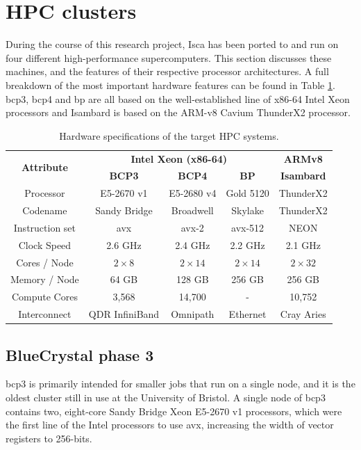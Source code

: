 \documentclass[a4paper,11pt]{report}
\begin{document}
\section{HPC clusters}
During the course of this research project, Isca has been ported to and run on four different high-performance supercomputers. This section discusses these machines, and the features of their respective processor architectures. A full breakdown of the most important hardware features can be found in Table \ref{tbl:hardware}. \gls{bcp3}, \gls{bcp4} and \gls{bp} are all based on the well-established line of x86-64 Intel Xeon processors and Isambard is based on the ARM-v8 Cavium ThunderX2 processor.
\begin{table}[!ht]
\centering
\caption[Hardware specifications of the target HPC systems]{Hardware specifications of the target HPC systems. }
\begin{tabular}{@{\extracolsep{4pt}}ccccc}
\toprule 
\multirow{2}{*}{\textbf{Attribute}} & \multicolumn{3}{c}{\textbf{Intel Xeon (x86-64)}} & \multicolumn{1}{c}{\textbf{ARMv8}}\\

				\cmidrule(lr){2-4} \cmidrule(lr){5-5}

 				& {\textbf{BCP3}} 	& {\textbf{BCP4}} 		& {\textbf{BP}} 		& {\textbf{Isambard}} \\
\midrule
Processor	   		& E5-2670 v1 		& E5-2680 v4			& Gold 5120			& ThunderX2	\\
Codename            	& Sandy Bridge	        & Broadwell         		& Skylake       		   	& ThunderX2   	\\
Instruction set		& \gls{avx}		& \gls{avx}-2			& \gls{avx}-512			& NEON		\\
Clock Speed	   	& 2.6 GHz		    	& 2.4 GHz				& 2.2 GHz				&  2.1 GHz 	\\
Cores / Node		& $2\times8$		& $2\times14$			& $2 \times 14$			& $2\times32$	\\
Memory / Node		& 64 GB			& 128 GB				& 256 GB					& 256 GB		\\
Compute Cores		& 3,568		    	&14,700				& -					& 10,752 		\\
Interconnect		&  QDR InfiniBand	& Omnipath			& Ethernet			& Cray Aries	\\
\bottomrule
\end{tabular}
\label{tbl:hardware}
\end{table}

\subsection{BlueCrystal phase 3}
\gls{bcp3} is primarily intended for smaller jobs that run on a single node, and it is the oldest cluster still in use at the University of Bristol. A single node of \gls{bcp3} contains two, eight-core Sandy Bridge Xeon E5-2670 v1 processors, which were the first line of the Intel processors to use \gls{avx}, increasing the width of vector registers to 256-bits. 
\end{document}
